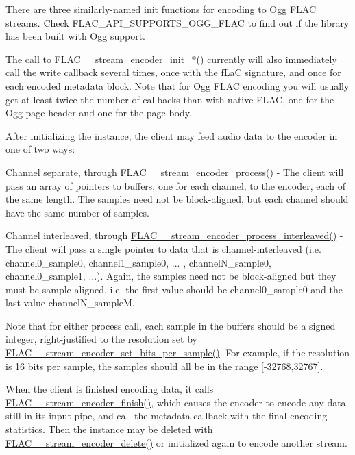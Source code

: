 There are three similarly-\/named init functions for encoding to Ogg F\+L\+AC streams. Check {\ttfamily F\+L\+A\+C\+\_\+\+A\+P\+I\+\_\+\+S\+U\+P\+P\+O\+R\+T\+S\+\_\+\+O\+G\+G\+\_\+\+F\+L\+AC} to find out if the library has been built with Ogg support.

The call to F\+L\+A\+C\+\_\+\+\_\+stream\+\_\+encoder\+\_\+init\+\_\+$\ast$() currently will also immediately call the write callback several times, once with the {\ttfamily f\+LaC} signature, and once for each encoded metadata block. Note that for Ogg F\+L\+AC encoding you will usually get at least twice the number of callbacks than with native F\+L\+AC, one for the Ogg page header and one for the page body.

After initializing the instance, the client may feed audio data to the encoder in one of two ways\+:


\begin{DoxyItemize}
\item Channel separate, through \hyperlink{group__flac__stream__encoder_gae187ec4f6cab3ca109637996ee23272d}{F\+L\+A\+C\+\_\+\+\_\+stream\+\_\+encoder\+\_\+process()} -\/ The client will pass an array of pointers to buffers, one for each channel, to the encoder, each of the same length. The samples need not be block-\/aligned, but each channel should have the same number of samples.
\item Channel interleaved, through \hyperlink{group__flac__stream__encoder_ga67c2ff5b23b945180797de420b1f27c0}{F\+L\+A\+C\+\_\+\+\_\+stream\+\_\+encoder\+\_\+process\+\_\+interleaved()} -\/ The client will pass a single pointer to data that is channel-\/interleaved (i.\+e. channel0\+\_\+sample0, channel1\+\_\+sample0, ... , channel\+N\+\_\+sample0, channel0\+\_\+sample1, ...). Again, the samples need not be block-\/aligned but they must be sample-\/aligned, i.\+e. the first value should be channel0\+\_\+sample0 and the last value channel\+N\+\_\+sampleM.
\end{DoxyItemize}

Note that for either process call, each sample in the buffers should be a signed integer, right-\/justified to the resolution set by \hyperlink{group__flac__stream__encoder_ga5a21cf7f86a81df6ba72714a6b917aa3}{F\+L\+A\+C\+\_\+\+\_\+stream\+\_\+encoder\+\_\+set\+\_\+bits\+\_\+per\+\_\+sample()}. For example, if the resolution is 16 bits per sample, the samples should all be in the range \mbox{[}-\/32768,32767\mbox{]}.

When the client is finished encoding data, it calls \hyperlink{group__flac__stream__encoder_gab2c1e5477c1e3fe9ad0d722ff8eecda2}{F\+L\+A\+C\+\_\+\+\_\+stream\+\_\+encoder\+\_\+finish()}, which causes the encoder to encode any data still in its input pipe, and call the metadata callback with the final encoding statistics. Then the instance may be deleted with \hyperlink{group__flac__stream__encoder_ga9c9956af42bebe923da59437628aa9ea}{F\+L\+A\+C\+\_\+\+\_\+stream\+\_\+encoder\+\_\+delete()} or initialized again to encode another stream.

